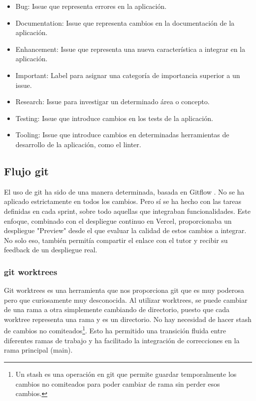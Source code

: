 \begin{itemize}\tightlist
    \item Bug: Issue que representa errores en la aplicación.
    \item Documentation: Issue que representa cambios en la documentación de la aplicación.
    \item Enhancement: Issue que representa una nueva característica a integrar en la aplicación.
    \item Important: Label para asignar una categoría de importancia superior a un issue.
    \item Research: Issue para investigar un determinado área o concepto.
    \item Testing: Issue que introduce cambios en los tests de la aplicación.
    \item Tooling: Issue que introduce cambios en determinadas herramientas de desarrollo de la aplicación, como el linter.
\end{itemize}

\subsection{Flujo git}
El uso de git ha sido de una manera determinada, basada en Gitflow \cite{gitflow}. No se ha aplicado estrictamente en todos los cambios. Pero sí se ha hecho con las tareas definidas en cada sprint, sobre todo aquellas que integraban funcionalidades. Este enfoque, combinado con el despliegue continuo en Vercel, proporcionaba un despliegue "Preview" desde el que evaluar la calidad de estos cambios a integrar. No solo eso, también permitía compartir el enlace con el tutor y recibir su feedback de un despliegue real.

\subsubsection{git worktrees}
Git worktrees \cite{git-worktree} es una herramienta que nos proporciona git que es muy poderosa pero que curiosamente muy desconocida. Al utilizar worktrees, se puede cambiar de una rama a otra simplemente cambiando de directorio, puesto que cada worktree representa una rama y es un directorio. No hay necesidad de hacer stash de cambios no comiteados\footnote{Un stash es una operación en git que permite guardar temporalmente los cambios no comiteados para poder cambiar de rama sin perder esos cambios.}. Esto ha permitido una transición fluida entre diferentes ramas de trabajo y ha facilitado la integración de correcciones en la rama principal (main).

